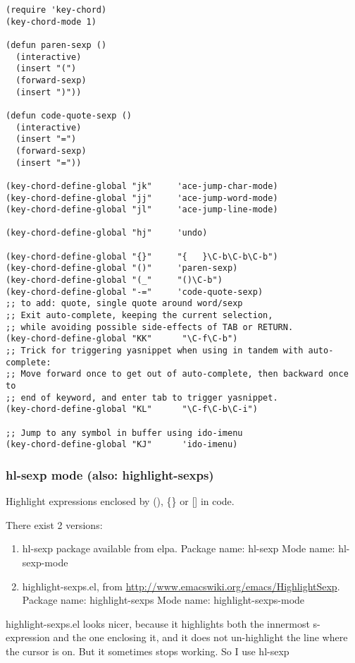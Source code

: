 \documentclass[nofonts]{tufte-handout}
\begin{document}
\begin{verbatim}
(require 'key-chord)
(key-chord-mode 1)

(defun paren-sexp ()
  (interactive)
  (insert "(")
  (forward-sexp)
  (insert ")"))

(defun code-quote-sexp ()
  (interactive)
  (insert "=")
  (forward-sexp)
  (insert "="))

(key-chord-define-global "jk"     'ace-jump-char-mode)
(key-chord-define-global "jj"     'ace-jump-word-mode)
(key-chord-define-global "jl"     'ace-jump-line-mode)

(key-chord-define-global "hj"     'undo)

(key-chord-define-global "{}"     "{   }\C-b\C-b\C-b")
(key-chord-define-global "()"     'paren-sexp)
(key-chord-define-global "(_"     "()\C-b")
(key-chord-define-global "-="     'code-quote-sexp)
;; to add: quote, single quote around word/sexp
;; Exit auto-complete, keeping the current selection,
;; while avoiding possible side-effects of TAB or RETURN.
(key-chord-define-global "KK"      "\C-f\C-b")
;; Trick for triggering yasnippet when using in tandem with auto-complete:
;; Move forward once to get out of auto-complete, then backward once to
;; end of keyword, and enter tab to trigger yasnippet.
(key-chord-define-global "KL"      "\C-f\C-b\C-i")

;; Jump to any symbol in buffer using ido-imenu
(key-chord-define-global "KJ"      'ido-imenu)
\end{verbatim}

\subsubsection{hl-sexp mode (also: highlight-sexps)}
\label{sec-1-11-17}

Highlight expressions enclosed by (), \{\} or [] in code.

There exist 2 versions:

\begin{enumerate}
\item hl-sexp package available from elpa.
Package name: hl-sexp
Mode name: hl-sexp-mode
\item highlight-sexps.el, from \url{http://www.emacswiki.org/emacs/HighlightSexp}.
Package name: highlight-sexps
Mode name: highlight-sexps-mode
\end{enumerate}

highlight-sexps.el looks nicer, because it highlights both the innermost s-expression and the one enclosing it, and it does not un-highlight the line where the cursor is on.  But it sometimes stops working.  So I use hl-sexp
\end{document}
